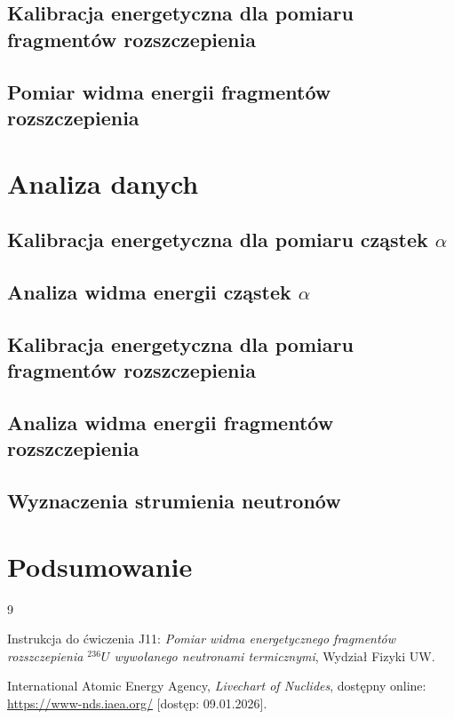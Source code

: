 \documentclass[a4paper,12pt]{article}
\begin{document}
\subsection{Kalibracja energetyczna dla pomiaru fragmentów rozszczepienia}

\subsection{Pomiar widma energii fragmentów rozszczepienia}


\section{Analiza danych}

\subsection{Kalibracja energetyczna dla pomiaru cząstek \texorpdfstring{$\alpha$}{alfa}}

\subsection{Analiza widma energii cząstek \texorpdfstring{$\alpha$}{alfa}}

\subsection{Kalibracja energetyczna dla pomiaru fragmentów rozszczepienia}

\subsection{Analiza widma energii fragmentów rozszczepienia}

\subsection{Wyznaczenia strumienia neutronów}

\FloatBarrier
\section{Podsumowanie}

\begin{thebibliography}{9}

Instrukcja do ćwiczenia J11: \emph{Pomiar widma energetycznego fragmentów rozszczepienia ${}^{236}U$ wywołanego neutronami termicznymi}, Wydział Fizyki UW.

International Atomic Energy Agency, \textit{Livechart of Nuclides}, dostępny online: \url{https://www-nds.iaea.org/} [dostęp: 09.01.2026].
\end{thebibliography}
\end{document}
